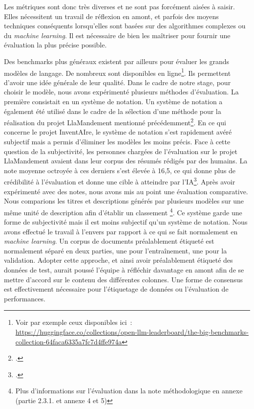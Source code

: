 Les métriques sont donc très diverses et ne sont pas forcément aisées à saisir. Elles nécessitent un travail de réflexion en amont, et parfois des moyens techniques conséquents
lorsqu'elles sont basées sur des algorithmes complexes ou du \emph{machine learning}. Il est nécessaire de bien les maîtriser pour fournir une 
évaluation la plus précise possible.

Des \gls{benchmark}s 
plus généraux existent par ailleurs pour évaluer les grands modèles de langage. De nombreux sont disponibles en ligne\footnote{Voir par exemple ceux disponibles ici~: \url{https://huggingface.co/collections/open-llm-leaderboard/the-big-benchmarks-collection-64faca6335a7fc7d4ffe974a}}.
Ils permettent d'avoir une idée générale de leur qualité.
Dans le cadre de notre stage, pour choisir le modèle, nous avons expérimenté plusieurs méthodes d'évaluation.
La première consistait en un système de notation. Un système de notation a également été utilisé dans le cadre de la sélection d'une méthode
pour la réalisation du projet LlaMandement mentionné précédemment\footcite{gesnouin_llamandement_2024}. 
En ce qui concerne le projet InventAIre, le système de notation s'est rapidement avéré subjectif 
mais a permis d'éliminer les modèles les moins précis. Face à cette question de la subjectivité, les personnes chargées
de l'évaluation sur le projet LlaMandement avaient dans leur corpus des résumés rédigés par des humains.
La note moyenne octroyée à ces derniers s'est élevée à 16,5, ce qui donne plus de crédibilité à l'évaluation et donne une cible
à atteindre par l'IA\footcite{gesnouin_llamandement_2024}.
Après avoir expérimenté avec des notes, nous avons mis au point une évaluation comparative. 
Nous comparions les titres et descriptions générés par plusieurs modèles sur une
même unité de description afin d'établir un classement
\footnote{Plus d'informations sur l'évaluation dans la note méthodologique en annexe (partie 2.3.1. et annexe 4 et 5)}. 
Ce système garde une forme de subjectivité mais il est moins subjectif qu'un système de notation.
Nous avons effectué le travail à l'envers par rapport à ce qui se fait normalement en \emph{machine learning}. 
Un corpus de documents préalablement étiqueté est normalement séparé en deux parties, une pour l'entraînement, une pour la validation.
Adopter cette approche, et ainsi avoir préalablement étiqueté des données de test, aurait poussé l'équipe à réfléchir davantage en amont afin de se mettre d'accord sur le contenu des différentes colonnes.
Une forme de consensus est effectivement nécessaire pour l'étiquetage de données ou l'évaluation de performances.
